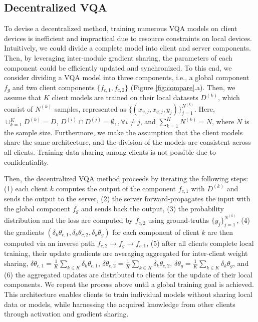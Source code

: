 \documentclass[letterpaper]{article} %
\begin{document}
\subsection{Decentralized VQA}
To devise a decentralized method, training numerous VQA models on client devices is inefficient and impractical due to resource constraints on local devices. Intuitively, we could divide a complete model into client and server components. Then, by leveraging inter-module gradient sharing, the parameters of each component could be efficiently updated and synchronized. To this end, we consider dividing a VQA model into three components, i.e., a global component $f_{g}$ and two client components $\{f_{c,1},f_{c,2}\}$ (Figure \ref{fig:compare}.a). Then, we assume that $K$ client models are trained on their local datasets $D^{(k)}$, which consist of $N^{(k)}$ samples, represented as $\{(x_{v,j}, x_{q,j}, y_j)\}_{j=1}^{N^{(k)}}$. Here, $\cup_{k=1}^K D^{(k)} = D$, $D^{(i)} \cap D^{(j)} = \emptyset,,\forall i\neq j$, and $\sum^{K}_{k=1} N^{(k)} = N$, where $N$ is the sample size. Furthermore, we make the assumption that the client models share the same architecture, and the division of the models are consistent across all clients. Training data sharing among clients is not possible due to confidentiality.

Then, the decentralized VQA method proceeds by iterating the following steps: (1) each client $k$ computes the output of the component $f_{c,1}$ with $D^{(k)}$ and sends the output to the server, (2) the server forward-propagates the input with the global component $f_{g}$ and sends back the output, (3) the probability distribution and the loss are computed by $f_{c,2}$ using ground-truths $\{y_j\}_{j=1}^{N^{(k)}}$, (4) the gradients $(\delta_k \theta_{c,1}, \delta_k \theta_{c,2}, \delta_k \theta_{g})$ for each component of client $k$ are then computed via an inverse path $f_{c,2}\rightarrow f_{g} \rightarrow f_{c,1}$, (5) after all clients complete local training, their update gradients are averaging aggregated for inter-client weight sharing, $\delta \theta_{c,1} = \frac{1}{K}\underset{k \in K} {\sum}\delta_k \theta_{c,1} $, $\delta \theta_{c,2} = \frac{1}{K}\underset{k \in K} {\sum}\delta_k \theta_{c,2} $, $\delta \theta_{g} = \frac{1}{K}\underset{k \in K} {\sum}\delta_k \theta_{g}$, and (6) the aggregated updates are distributed to clients for the update of their local components. We repeat the process above until a global training goal is achieved. This architecture enables clients to train individual models without sharing local data or models, while harnessing the acquired knowledge from other clients through activation and gradient sharing.
\end{document}
